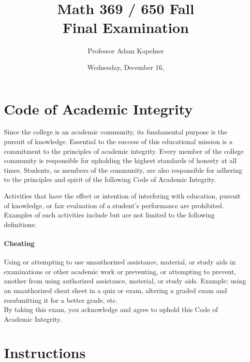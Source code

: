 \documentclass[12pt,landscape]{article}
\title{Math 369 / 650 Fall \the\year{} \\ Final Examination}
\author{Professor Adam Kapelner}
\date{Wednesday, December 16, \the\year{}}
\begin{document}
\maketitle


\thispagestyle{empty}

\section*{Code of Academic Integrity}

\footnotesize
Since the college is an academic community, its fundamental purpose is the pursuit of knowledge. Essential to the success of this educational mission is a commitment to the principles of academic integrity. Every member of the college community is responsible for upholding the highest standards of honesty at all times. Students, as members of the community, are also responsible for adhering to the principles and spirit of the following Code of Academic Integrity.

Activities that have the effect or intention of interfering with education, pursuit of knowledge, or fair evaluation of a student's performance are prohibited. Examples of such activities include but are not limited to the following definitions:

\paragraph{Cheating} Using or attempting to use unauthorized assistance, material, or study aids in examinations or other academic work or preventing, or attempting to prevent, another from using authorized assistance, material, or study aids. Example: using an unauthorized cheat sheet in a quiz or exam, altering a graded exam and resubmitting it for a better grade, etc.
\\

\noindent By taking this exam, you acknowledge and agree to uphold this Code of Academic Integrity. \\


\normalsize

\section*{Instructions}
\end{document}
